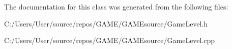 The documentation for this class was generated from the following files\+:\begin{DoxyCompactItemize}
\item 
C\+:/\+Users/\+User/source/repos/\+G\+A\+M\+E/\+G\+A\+M\+Esource/Game\+Level.\+h\item 
C\+:/\+Users/\+User/source/repos/\+G\+A\+M\+E/\+G\+A\+M\+Esource/Game\+Level.\+cpp\end{DoxyCompactItemize}
